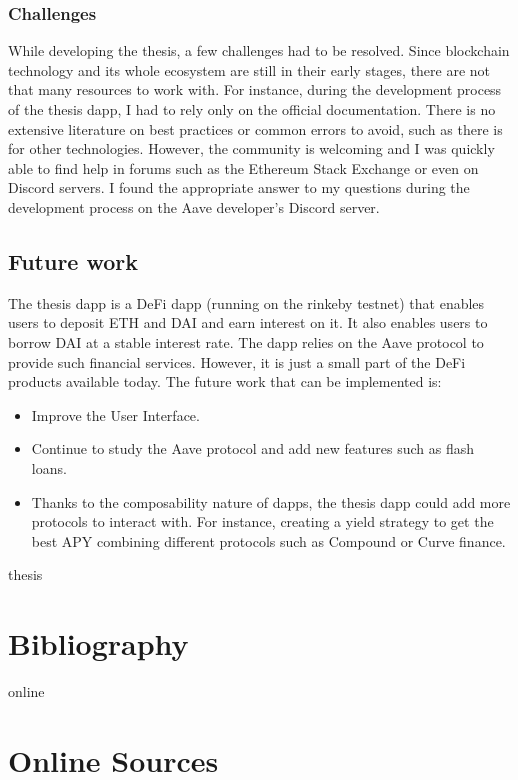 \documentclass[11pt,a4paper]{report}
\begin{document}
\subsubsection{Challenges}
While developing the thesis, a few challenges had to be resolved. Since blockchain technology and its whole ecosystem are still in their early stages, there are not that many resources to work with. For instance, during the development process of the thesis dapp, I had to rely only on the official documentation. There is no extensive literature on best practices or common errors to avoid, such as there is for other technologies. However, the community is welcoming and I was quickly able to find help in forums such as the Ethereum Stack Exchange\cite{ethstack} or even on Discord\cite{discord} servers. I found the appropriate answer to my questions during the development process on the Aave developer's Discord server.
\subsection{Future work}
The thesis dapp is a DeFi dapp (running on the rinkeby testnet) that enables users to deposit ETH and DAI and earn interest on it. It also enables users to borrow DAI at a stable interest rate. The dapp relies on the Aave protocol to provide such financial services. However, it is just a small part of the DeFi products available today.  The future work that can be implemented is:
\begin{itemize}
	\item Improve the User Interface.
	\item Continue to study the Aave protocol and add new features such as flash loans\cite{flashloan}.
	\item Thanks to the composability nature of dapps, the thesis dapp could add more protocols to interact with. For instance, creating a yield strategy to get the best APY combining different protocols such as Compound\cite{compound} or Curve finance\cite{curve}.
\end{itemize}

\newpage

\begin{btSect}{thesis} %
\section*{Bibliography}
\btPrintCited
\end{btSect}
\begin{btSect}{online}
\section*{Online Sources}
\btPrintCited
\end{btSect}
\end{document}
